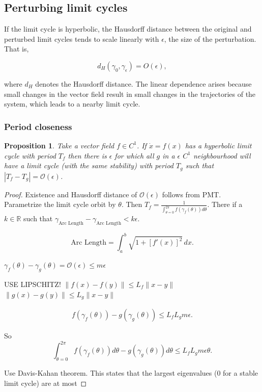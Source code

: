 \documentclass{article}
\newtheorem{proposition}{Proposition}
\theoremstyle{definition}
\theoremstyle{remark}
\newcommand{\reals}{\mathbb{R}}
\newcounter{ct}
\begin{document}
\subsection{Perturbing limit cycles}
If the limit cycle is hyperbolic, the Hausdorff distance between the original and perturbed limit cycles tends to scale linearly with \(\epsilon\), the size of the perturbation. That is,

\[
d_H(\gamma_0, \gamma_\epsilon) = O(\epsilon),
\]

where \(d_H\) denotes the Hausdorff distance. The linear dependence arises because small changes in the vector field result in small changes in the trajectories of the system, which leads to a nearby limit cycle.


\subsubsection{Period closeness}\label{sec:periodcloseness}
\begin{proposition}\label{prop:periodcloseness}%
Take a vector field $f\in C^1$.
If $\dot x = f(x)$ has a hyperbolic limit cycle with period $T_f$ then there is $\epsilon$ for which all $g$ in a $\epsilon$ $C^1$ neighbourhood will have a limit cycle (with the same stability) with period $T_g$ such that  $|T_f-T_g| = \mathcal{O}(\epsilon)$.
\end{proposition}

\begin{proof}
Existence and Hausdorff distance of $\mathcal{O}(\epsilon)$ follows from PMT.
Parametrize the limit cycle orbit by $\theta$.
Then $T_f = \frac{1}{\int_{\theta=0}^{2\pi}f(\gamma_f(\theta))d\theta}$.
There if a $k\in\reals$ such that $\gamma_{\text{Arc Length}} - \gamma_{\text{Arc Length}}<k\epsilon$.

\[\text{Arc Length} = \int_a^b \sqrt{1 + [f'(x)]^2} \, dx.\]

$\gamma_f(\theta)-\gamma_g(\theta) = \mathcal{O}(\epsilon) \leq m\epsilon$ %


USE LIPSCHITZ! 
$\|f(x)-f(y)\|\leq L_f\|x-y\|$
$\|g(x)-g(y)\|\leq L_g\|x-y\|$


\begin{align}
f(\gamma_f(\theta)) - g(\gamma_g(\theta)) \leq  L_fL_gm\epsilon.
\end{align}

So \[\int_{\theta=0}^{2\pi}f(\gamma_f(\theta))d\theta-g(\gamma_g(\theta))d\theta\leq L_fL_gm\epsilon\theta.\]


Use Davis-Kahan theorem. 
This states that the largest eigenvalues (0 for a stable limit cycle) are at most 
\end{proof}
\end{document}
